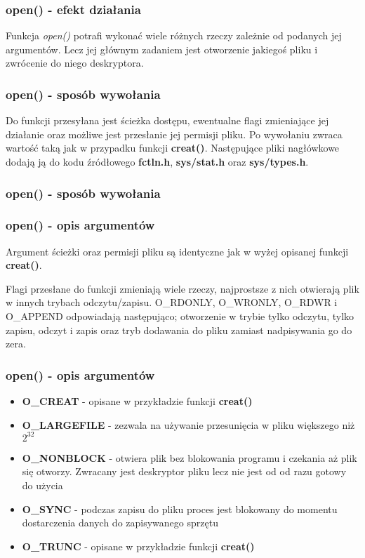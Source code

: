 \documentclass{beamer}
\begin{document}
\begin{frame}
	\frametitle{open() - efekt działania}
Funkcja \textit{open()} potrafi wykonać wiele różnych rzeczy zależnie od podanych jej argumentów.
Lecz jej głównym zadaniem jest otworzenie jakiegoś pliku i zwrócenie do niego deskryptora.
\end{frame}

\begin{frame}
	\frametitle{open() - sposób wywołania}
Do funkcji przesyłana jest ścieżka dostępu, ewentualne flagi zmieniające jej działanie oraz możliwe jest przesłanie jej permisji pliku.
Po wywołaniu zwraca wartość taką jak w przypadku funkcji \textbf{creat()}.
Następujące pliki nagłówkowe dodają ją do kodu źródłowego \textbf{fctln.h}, \textbf{sys/stat.h} oraz \textbf{sys/types.h}.
\end{frame}

\begin{frame}
	\frametitle{open() - sposób wywołania}
	\lstopen
\end{frame}

\begin{frame}
	\frametitle{open() - opis argumentów}
Argument ścieżki oraz permisji pliku są identyczne jak w wyżej opisanej funkcji \textbf{creat()}.

Flagi przesłane do funkcji zmieniają wiele rzeczy, najprostsze z nich otwierają plik w innych trybach odczytu/zapisu.
O\_RDONLY, O\_WRONLY, O\_RDWR i O\_APPEND odpowiadają następująco; otworzenie w trybie tylko odczytu, tylko zapisu, odczyt i zapis oraz tryb dodawania do pliku zamiast nadpisywania go do zera.
\end{frame}

\begin{frame}
	\frametitle{open() - opis argumentów}
\begin{itemize}
\item \textbf{O\_CREAT} - opisane w przykładzie funkcji \textbf{creat()}
\item \textbf{O\_LARGEFILE} - zezwala na używanie przesunięcia w pliku większego niż $2^{32}$
\item \textbf{O\_NONBLOCK} - otwiera plik bez blokowania programu i czekania aż plik się otworzy. Zwracany jest deskryptor pliku lecz nie jest od od razu gotowy do użycia
\item \textbf{O\_SYNC} - podczas zapisu do pliku proces jest blokowany do momentu dostarczenia danych do zapisywanego sprzętu
\item \textbf{O\_TRUNC} - opisane w przykładzie funkcji \textbf{creat()}
\end{itemize}
\end{frame}
\end{document}
